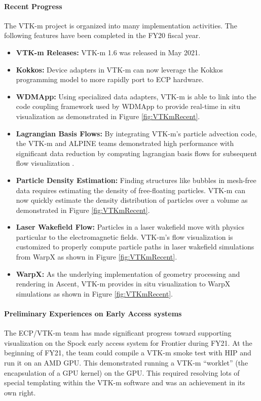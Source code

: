 \paragraph{Recent Progress}
The VTK-m project is organized into many implementation activities.
The following features have been completed in the FY20 fiscal year.

\begin{itemize}
\item \textbf{VTK-m Releases:}
  VTK-m 1.6 was released in May 2021.
\item \textbf{Kokkos:}
  Device adapters in VTK-m can now leverage the Kokkos programming model to more rapidly port to ECP hardware.
\item \textbf{WDMApp:}
  Using specialized data adapters, VTK-m is able to link into the code coupling framework used by WDMApp to provide real-time in situ visualization as demonstrated in Figure \ref{fig:VTKmRecent}.
\item \textbf{Lagrangian Basis Flows:}
  By integrating VTK-m's particle advection code, the VTK-m and ALPINE teams demonstrated high performance with significant data reduction by computing lagrangian basis flows for subsequent flow visualization \cite{Sane2021:EGPGV,Sane2021:ICCS}.
\item \textbf{Particle Density Estimation:}
  Finding structures like bubbles in mesh-free data requires estimating the density of free-floating particles. VTK-m can now quickly estimate the density distribution of particles over a volume as demonstrated in Figure \ref{fig:VTKmRecent}.
\item \textbf{Laser Wakefield Flow:}
  Particles in a laser wakefield move with physics particular to the electromagnetic fields. VTK-m's flow visualization is customized to properly compute particle paths in laser wakefield simulations from WarpX as shown in Figure \ref{fig:VTKmRecent}.
\item \textbf{WarpX:}
  As the underlying implementation of geometry processing and rendering in Ascent, VTK-m provides in situ visualization to WarpX simulations as shown in Figure \ref{fig:VTKmRecent}.
\end{itemize}

\paragraph{Preliminary Experiences on Early Access systems}
The ECP/VTK-m team has made significant progress toward supporting visualization on the Spock early access system for Frontier during FY21.
At the beginning of FY21, the team could compile a VTK-m smoke test with HIP and run it on an AMD GPU.
This demonstrated running a VTK-m ``worklet'' (the encapsulation of a GPU kernel) on the GPU.
This required resolving lots of special templating within the VTK-m software and was an achievement in its own right.

